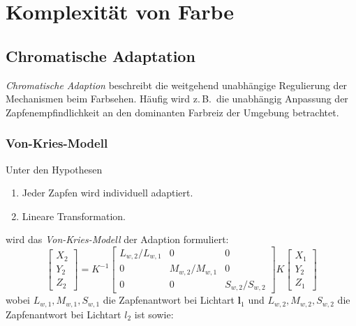 \documentclass[a4paper, 11pt, accentcolor = tud3b]{tudreport}
\renewcommand{\vec}[1]{\boldsymbol{\mathbf{#1}}}
\newcommand{\zB}{z.\,B.~}
\begin{document}
		\section{Komplexität von Farbe}
			\subsection{Chromatische Adaptation}
				\emph{Chromatische Adaption} beschreibt die weitgehend unabhängige Regulierung der Mechanismen beim Farbsehen. Häufig wird \zB die unabhängig Anpassung der Zapfenempfindlichkeit an den dominanten Farbreiz der Umgebung betrachtet.

				\subsubsection{Von-Kries-Modell}
					Unter den Hypothesen
					\begin{enumerate}
						\item Jeder Zapfen wird individuell adaptiert.
						\item Lineare Transformation.
					\end{enumerate}
					wird das \emph{Von-Kries-Modell} der Adaption formuliert:
					\begin{equation*}
						\begin{bmatrix}
							X_2 \\
							Y_2 \\
							Z_2
						\end{bmatrix}
						=
						K^{-1}
						\begin{bmatrix}
							L_{w, 2} / L_{w, 1} & 0 & 0 \\
							0 & M_{w, 2} / M_{w, 1} & 0 \\
							0 & 0 & S_{w, 2} / S_{w, 2}
						\end{bmatrix}
						K
						\begin{bmatrix}
							X_1 \\
							Y_2 \\
							Z_1
						\end{bmatrix}
					\end{equation*}
					wobei \( L_{w, 1}, M_{w, 1}, S_{w, 1} \) die Zapfenantwort bei Lichtart \( \vec{l}_1 \) und \( L_{w, 2}, M_{w, 2}, S_{w, 2} \) die Zapfenantwort bei Lichtart \(l_2\) ist sowie:
\end{document}
